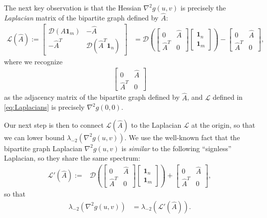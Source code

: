 The next key observation is that the Hessian $\nabla^{2}g(u,v)$ is precisely the \emph{Laplacian}
matrix of the bipartite graph defined by $\hat{A}$: 
\begin{align*}
\mathcal{L}(\hat{A}):=\begin{bmatrix}\mathcal{D}(A\mathbf{1}_{m}) & -\hat{A}\\
-\hat{A}^{T} & \mathcal{D}(\hat{A}^{T}\mathbf{1}_{n})
\end{bmatrix} & =\mathcal{D}(\begin{bmatrix}0 & \hat{A}\\
\hat{A}^{T} & 0
\end{bmatrix}\begin{bmatrix}\mathbf{1}_{n}\\
\mathbf{1}_{m}
\end{bmatrix})-\begin{bmatrix}0 & \hat{A}\\
\hat{A}^{T} & 0
\end{bmatrix},
\end{align*}
where we recognize 
\begin{align*}
\begin{bmatrix}0 & \hat{A}\\
\hat{A}^{T} & 0
\end{bmatrix}
\end{align*}
as the adjacency matrix of the bipartite graph defined by $\hat{A}$, and $\mathcal{L}$ defined in \eqref{eq:Laplacians} is precisely $\nabla^2g(0,0)$.

Our next step is then to connect $\mathcal{L}(\hat{A})$ to the Laplacian $\mathcal{L}$ at the origin, so that we can lower bound $\lambda_{-2}(\nabla^{2}g(u,v))$. We use the
well-known fact that the bipartite graph Laplacian $\nabla^{2}g(u,v)$
is \emph{similar} to the following ``signless'' Laplacian, so they share the
same spectrum:
\begin{align*}
\mathcal{L}'(\hat{A}):= & \mathcal{D}(\begin{bmatrix}0 & \hat{A}\\
\hat{A}^{T} & 0
\end{bmatrix}\begin{bmatrix}\mathbf{1}_{n}\\
\mathbf{1}_{m}
\end{bmatrix})+\begin{bmatrix}0 & \hat{A}\\
\hat{A}^{T} & 0
\end{bmatrix},
\end{align*}
 so that 
\begin{align*}
\lambda_{-2}(\nabla^{2}g(u,v)) & =\lambda_{-2}(\mathcal{L}'(\hat{A})).
\end{align*}

